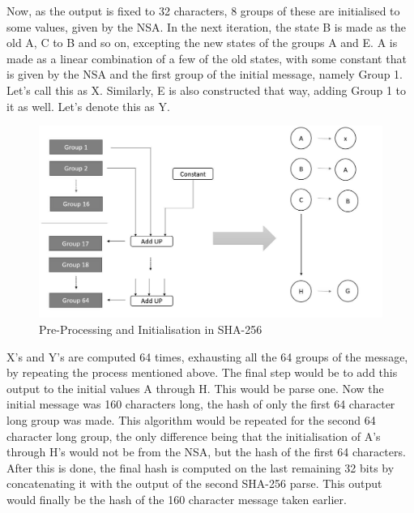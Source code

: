 \documentclass[12pt,a4paper]{report}
\begin{document}
\begin{justify}
\vspace{10mm}

Now, as the output is fixed to 32 characters, 8 groups of these are initialised to some values, given by the NSA. In the next iteration, the state B is made as the old A, C to B and so on, excepting the new states of the groups A and E. A is made as a linear combination of a few of the old states, with some constant that is given by the NSA and the first group of the initial message, namely Group 1. Let's call this as X. Similarly, E is also constructed that way, adding Group 1 to it as well. Let's denote this as Y. \newline

\vspace{10mm}
\begin{figure}[h]
\centering
\caption{Pre-Processing and Initialisation in SHA-256}
\includegraphics[scale=0.25]{pics/sh256.JPG}
\end{figure}
\vspace{10mm}



X's and Y's are computed 64 times, exhausting all the 64 groups of the message, by repeating the process mentioned above. The final step would be to add this output to the initial values A through H. This would be parse one.\newline
Now the initial message was 160 characters long, the hash of only the first 64 character long group was made. This algorithm would be repeated for the second 64 character long group, the only difference being that the initialisation of A's through H's would not be from the NSA, but the hash of the first 64 characters. After this is done, the final hash is computed on the last remaining 32 bits by concatenating it with the output of the second SHA-256 parse.\newline
This output would finally be the hash of the 160 character message taken earlier. 


\end{justify}
\end{document}
